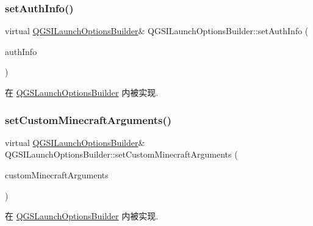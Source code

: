 \subsubsection{\texorpdfstring{set\+Auth\+Info()}{setAuthInfo()}}
{\footnotesize\ttfamily virtual \mbox{\hyperlink{class_q_g_s_i_launch_options_builder}{Q\+G\+S\+I\+Launch\+Options\+Builder}}\& Q\+G\+S\+I\+Launch\+Options\+Builder\+::set\+Auth\+Info (\begin{DoxyParamCaption}\item[{const \mbox{\hyperlink{class_q_g_s_auth_info}{Q\+G\+S\+Auth\+Info}} \&}]{auth\+Info }\end{DoxyParamCaption})\hspace{0.3cm}{\ttfamily [pure virtual]}}



在 \mbox{\hyperlink{class_q_g_s_launch_options_builder_a01f8d9b1f6efde74a5a22013d3555c6a}{Q\+G\+S\+Launch\+Options\+Builder}} 内被实现.

\mbox{\label{class_q_g_s_i_launch_options_builder_a3db1cb775f5004d68550c3f7e31f3cb1}} 
\subsubsection{\texorpdfstring{set\+Custom\+Minecraft\+Arguments()}{setCustomMinecraftArguments()}}
{\footnotesize\ttfamily virtual \mbox{\hyperlink{class_q_g_s_i_launch_options_builder}{Q\+G\+S\+I\+Launch\+Options\+Builder}}\& Q\+G\+S\+I\+Launch\+Options\+Builder\+::set\+Custom\+Minecraft\+Arguments (\begin{DoxyParamCaption}\item[{const Q\+Map$<$ Q\+String, Q\+String $>$ \&}]{custom\+Minecraft\+Arguments }\end{DoxyParamCaption})\hspace{0.3cm}{\ttfamily [pure virtual]}}



在 \mbox{\hyperlink{class_q_g_s_launch_options_builder_a2b8fdfaea89a1a59ee8a1ae39b1ec3ff}{Q\+G\+S\+Launch\+Options\+Builder}} 内被实现.

\mbox{\label{class_q_g_s_i_launch_options_builder_ab3669bbcb9fc5602356cc05bc030b306}} 
